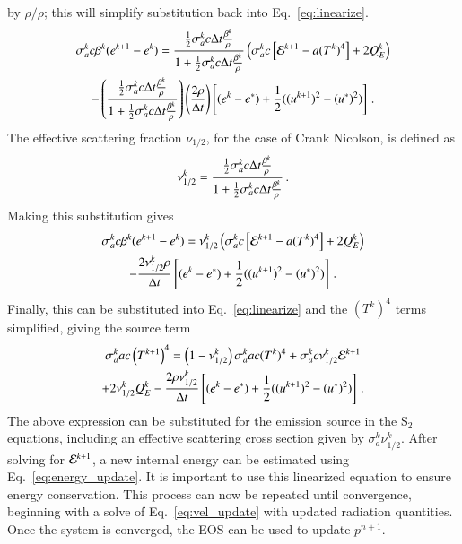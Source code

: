 by $\rho/\rho$; this will simplify substitution back into
Eq.~\eqref{eq:linearize}.
\begin{multline}
    \sigma_a^k c \beta^k (e^{k+1} - e^k) = \frac{\frac{1}{2}\sigma_a^k c \Delta t
    \frac{\beta^k}{\rho}}{1+\frac{1}{2}\sigma_a^k c \Delta t \frac{\beta^k}{\rho}}
    \left(\sigma_a^k c\left[\mathcal{E}^{k+1} - a (T^k)^4\right] + 2Q_E^k\right)\\
    - \left(\frac{\frac{1}{2}\sigma_a^k c\Delta t \frac{\beta^k}{\rho}}
    {1 +\frac{1}{2}\sigma_a^k c \Delta t \frac{\beta^k}{\rho}}\right)
    \left(\frac{2\rho}{\Delta t}\right)\left[(e^k - e^*)
    + \frac{1}{2}((u^{k+1})^2 - (u^*)^2)\right] \, .
 \end{multline}
The effective scattering fraction $\nu_{1/2}$, for the case of Crank Nicolson, is
defined as
\begin{equation}
    \nu_{1/2}^k = \frac{\frac{1}{2}\sigma_a^k c\Delta t \frac{\beta^k}{\rho}}
    {1 + \frac{1}{2}\sigma_a^k c\Delta t \frac{\beta^k}{\rho}  } \, .
\end{equation}
Making this substitution gives
\begin{multline*}
    \sigma_a^k c \beta^k(e^{k+1} - e^k) = \nu_{1/2}^k \left(\sigma_a^k c
    \left[\mathcal{E}^{k+1} - a (T^k)^4\right] + 2Q_E^k\right)\\
    -\frac{2\nu_{1/2}^k\rho}{\Delta t} \left[(e^k - e^*)
    + \frac{1}{2}((u^{k+1})^2 - (u^*)^2)\right] \, .
\end{multline*}
Finally, this can be substituted into Eq.~\eqref{eq:linearize} and the $(T^k)^4$
terms simplified, giving the source term
\begin{multline}
   \sigma_a^k a c\left(T^{k+1}\right)^4 = \left(1 - \nu_{1/2}^k\right)
   \sigma_a^k a c (T^k)^4 + \sigma_a^k c \nu_{1/2}^k \mathcal{E}^{k+1}\\
   +2\nu_{1/2}^k Q_E^k - \frac{2\rho\nu_{1/2}^k}{\Delta t}
   \left[(e^k - e^*) + \frac{1}{2}((u^{k+1})^2 - (u^*)^2)\right] \, .
\end{multline}
The above expression can be substituted for the emission source in the S$_2$
equations, including an effective scattering cross section given by $\sigma_a^k
\nu_{1/2}^k$.  After solving for $\mathcal{E}^{k+1}$, a new internal energy can be estimated
using Eq.~\eqref{eq:energy_update}. It is important to use this linearized
equation to ensure energy conservation.  This process can now be repeated until
convergence, beginning with a solve of Eq.~\eqref{eq:vel_update} with updated
radiation quantities.  Once the system is converged, the EOS can be used to
update $p^{n+1}$.


